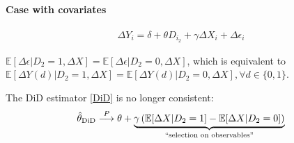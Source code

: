 \documentclass[11pt]{elegantbook}
\begin{document}
\paragraph*{Case with covariates}
\begin{equation}
    \begin{aligned}
        \Delta Y_i=\delta+\theta D_{i_2}+\gamma\Delta X_i+\Delta\epsilon_i
    \end{aligned}
    \nonumber
\end{equation}
\begin{assumption}
    $\mathbb{E}[\Delta\epsilon|D_2=1,\Delta X]=\mathbb{E}[\Delta\epsilon|D_2=0,\Delta X]$, which is equivalent to $\mathbb{E}[\Delta Y(d)|D_2=1,\Delta X]=\mathbb{E}[\Delta Y(d)|D_2=0,\Delta X],\forall d\in\{0,1\}$.
\end{assumption}

\begin{remark}
    The DiD estimator \eqref{DiD} is no longer consistent:
    \begin{equation}
        \begin{aligned}
            \hat{\theta}_\textnormal{DiD} \stackrel{P}{\longrightarrow} \theta+\underbrace{\gamma\left(\mathbb{E}[\Delta X|D_2=1]-\mathbb{E}[\Delta X|D_2=0]\right)}_\textnormal{``selection on observables''}
        \end{aligned}
        \nonumber
    \end{equation}
\end{remark}
\end{document}

